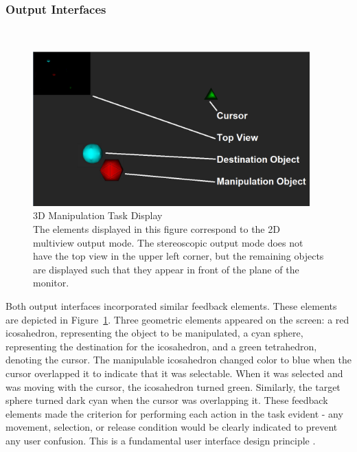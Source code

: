 \documentclass[pageno]{jpaper}
\begin{document}
\subsubsection{Output Interfaces}$ $\\
\begin{figure}
\centering
\includegraphics[width=0.95\textwidth]{figures/labelledexperiment.png}
\caption{3D Manipulation Task Display \\
The elements displayed in this figure correspond to the 2D multiview output mode. The stereoscopic
output mode does not have the top view in the upper left corner, but the remaining objects are displayed
such that they appear in front of the plane of the monitor.}
\label{fig:experimentdisplay}
\end{figure}
Both output interfaces incorporated similar feedback elements. These elements are depicted in
Figure~\ref{fig:experimentdisplay}. Three geometric elements
appeared on the screen: a red icosahedron, representing the object to be manipulated, a
cyan sphere, representing the destination for the icosahedron, and a green tetrahedron,
denoting the cursor. The manipulable icosahedron changed color to blue when the cursor
overlapped it to indicate that it was selectable. When it was selected and was moving
with the cursor, the icosahedron turned green. Similarly, the target sphere turned dark
cyan when the cursor was overlapping it. These feedback elements made the criterion for
performing each action in the task evident -
any movement, selection, or release condition would be clearly indicated to prevent any user
confusion. This is a fundamental user interface design principle \cite{bravenuiworld}.
\end{document}

